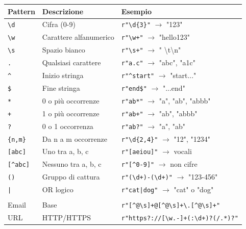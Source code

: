 \begin{tcolorbox}[title={Per chi viene da C/Java/JS: stringhe, bytes ed encoding}]
\begin{table}[h]
\centering
\begin{tabular}{|l|l|p{6cm}|}
\hline
\rowcolor{blue!20}
\textbf{Pattern} & \textbf{Descrizione} & \textbf{Esempio} \\ \hline
\texttt{\textbackslash d} & Cifra (0-9) & \texttt{r"\textbackslash d\{3\}"} $\rightarrow$ "123" \\ \hline
\texttt{\textbackslash w} & Carattere alfanumerico & \texttt{r"\textbackslash w+"} $\rightarrow$ "hello123" \\ \hline
\texttt{\textbackslash s} & Spazio bianco & \texttt{r"\textbackslash s+"} $\rightarrow$ " \textbackslash t\textbackslash n" \\ \hline
\texttt{.} & Qualsiasi carattere & \texttt{r"a.c"} $\rightarrow$ "abc", "a1c" \\ \hline
\texttt{\textasciicircum} & Inizio stringa & \texttt{r"\textasciicircum start"} $\rightarrow$ "start..." \\ \hline
\texttt{\$} & Fine stringa & \texttt{r"end\$"} $\rightarrow$ "...end" \\ \hline
\texttt{*} & 0 o più occorrenze & \texttt{r"ab*"} $\rightarrow$ "a", "ab", "abbb" \\ \hline
\texttt{+} & 1 o più occorrenze & \texttt{r"ab+"} $\rightarrow$ "ab", "abbb" \\ \hline
\texttt{?} & 0 o 1 occorrenza & \texttt{r"ab?"} $\rightarrow$ "a", "ab" \\ \hline
\texttt{\{n,m\}} & Da n a m occorrenze & \texttt{r"\textbackslash d\{2,4\}"} $\rightarrow$ "12", "1234" \\ \hline
\texttt{[abc]} & Uno tra a, b, c & \texttt{r"[aeiou]"} $\rightarrow$ vocali \\ \hline
\texttt{[\textasciicircum abc]} & Nessuno tra a, b, c & \texttt{r"[\textasciicircum 0-9]"} $\rightarrow$ non cifre \\ \hline
\texttt{()} & Gruppo di cattura & \texttt{r"(\textbackslash d+)-(\textbackslash d+)"} $\rightarrow$ "123-456" \\ \hline
\texttt{|} & OR logico & \texttt{r"cat|dog"} $\rightarrow$ "cat" o "dog" \\ \hline
\rowcolor{green!10}
\multicolumn{3}{|l|}{\textbf{Pattern Pratici Comuni:}} \\ \hline
Email & Base & \texttt{r"[\textasciicircum @\textbackslash s]+@[\textasciicircum @\textbackslash s]+\textbackslash .[\textasciicircum @\textbackslash s]+"} \\ \hline
URL & HTTP/HTTPS & \texttt{r"https?://[\textbackslash w.-]+(:\textbackslash d+)?(/.*)?"} \\ \hline

\end{tabular}
\end{table}
\end{tcolorbox}
